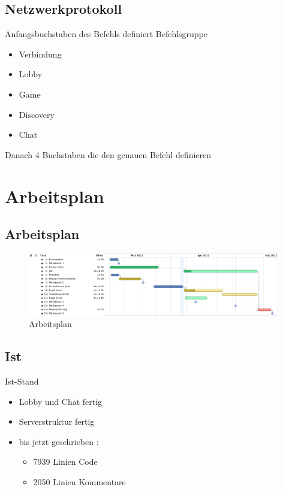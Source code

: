 \documentclass[12pt, utf8]{beamer}
\begin{document}
\subsection{Netzwerkprotokoll}
\begin{frame}
	\begin{definition}
		Anfangsbuchstaben des Befehls definiert Befehlsgruppe
		\begin{itemize}
			\item Verbindung
			\item Lobby
			\item Game
			\item Discovery
			\item Chat
		\end{itemize}
	\end{definition}
	\begin{definition}
		Danach 4 Buchstaben die den genauen Befehl definieren
	\end{definition}
\end{frame}

\section{Arbeitsplan}
\subsection{Arbeitsplan}
\begin{frame}
\centering
\begin{figure}
\includegraphics[width=11cm]{images/cs108.ps}
\caption{Arbeitsplan}
	\end{figure}
\end{frame}

\subsection{Ist} 
\begin{frame}{Ist-Stand}
\begin{itemize}
\item Lobby und Chat fertig
\item Serverstruktur fertig
\item bis jetzt geschrieben :
\begin{itemize}
\item 7939 Linien Code
\item 2050 Linien Kommentare
\end{itemize}

\end{itemize}
\end{frame}
\end{document}
